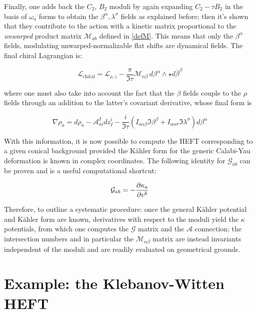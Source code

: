 Finally, one adds back the $C_2$, $B_2$ moduli by again expanding $C_2 - \tau B_2$ in the basis of $\omega_a$ forms to obtain the $\beta^\alpha, \lambda^\sigma$ fields as explained before; then it's shown that they contribute to the action with a kinetic matrix proportional to the \emph{unwarped} product matrix $\mathcal{M}_{ab}$ defined in \ref{defM}. This means that only the $\beta^\alpha$ fields, modulating unwarped-normalizable flat shifts are dynamical fields. The final chiral Lagrangian is:

\begin{equation}
	\mathcal{L}_\text{chiral} = \mathcal{L}_{\rho,z} - \frac{\pi}{\Im\tau} \mathcal{M}_{\alpha\beta} \,d\beta^\alpha \wedge \star d\bar \beta^\beta
	\label{}
\end{equation}

where one must also take into account the fact that the $\beta$ fields couple to the $\rho$ fields through an addition to the latter's covariant derivative, whose final form is

\begin{equation}
	\nabla \rho_a = d\rho_a - \mathcal{A}_{ai}^I dz^i_I - \frac{i}{\Im \tau}\left( I_{a\alpha\beta} \Im \beta^\beta + I_{a\alpha\sigma} \Im \lambda^\sigma \right) d\beta^\alpha
	\label{}
\end{equation}

With this information, it is now possible to compute the HEFT corresponding to a given conical background provided the K\"ahler form for the generic Calabi-Yau deformation is known in complex coordinates. The following identity for $\mathcal{G}_{ab}$ can be proven\cite{MZ} and is a useful computational shortcut:

\begin{equation}
	\mathcal{G}_{ab} = - \frac{\partial\kappa_a}{\partial v^b}
	\label{Gshortcut}
\end{equation}

Therefore, to outline a systematic procedure: once the general K\"ahler potential and K\"ahler form are known, derivatives with respect to the moduli yield the $\kappa$ potentials, from which one computes the $\mathcal{G}$ matrix and the $\mathcal{A}$ connection; the intersection numbers and in particular the $\mathcal{M}_{\alpha\beta}$ matrix are instead invariants independent of the moduli and are readily evaluated on geometrical grounds.

\section{Example: the Klebanov-Witten HEFT}

